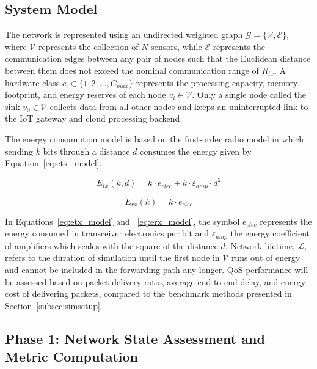 \documentclass[a4paper,fleqn]{cas-dc}
\numberwithin{equation}{section}
\begin{document}
\subsection{System Model}
\label{subsec:sysmodel}

The network is represented using an undirected weighted graph
$\mathcal{G} = \{\mathcal{V}, \mathcal{E}\}$, where $\mathcal{V}$
represents the collection of $N$ sensors, while $\mathcal{E}$
represents the communication edges between any pair of nodes such
that the Euclidean distance between them does not exceed the
nominal communication range of $R_{tx}$.\cite{HaddadPajouh2019SurveyIoTSecurity,Laroui2021EdgeFogIoT}
A hardware class $c_i \in \{1, 2, \ldots, C_{max}\}$ represents
the processing capacity, memory footprint, and energy reserves of
each node $v_i \in \mathcal{V}$. Only a single node called the sink
$v_0 \in \mathcal{V}$ collects data from all other nodes and keeps
an uninterrupted link to the IoT gateway and cloud processing
backend.

The energy consumption model is based on the first-order radio
model in which sending $k$ bits through a distance $d$ consumes the
energy given by Equation~\ref{eq:etx_model}.

\begin{equation}
\label{eq:etx_model}
E_{tx}(k, d) = k \cdot e_{elec} + k \cdot \varepsilon_{amp} \cdot d^{2}
\end{equation}

\begin{equation}
\label{eq:erx_model}
E_{rx}(k) = k \cdot e_{elec}
\end{equation}

In Equations~\ref{eq:etx_model} and ~\ref{eq:erx_model}, 
the symbol $e_{elec}$ represents the energy consumed in transceiver electronics per bit
and $\varepsilon_{amp}$ the energy coefficient of amplifiers which scales with the square of the distance $d$. Network lifetime, $\mathcal{L}$, refers to the duration of simulation until the first node in $\mathcal{V}$ runs out of energy and cannot be included in the forwarding path any longer. QoS performance will be assessed based on packet delivery ratio, average end-to-end delay, and energy cost of delivering packets, compared to the benchmark methods presented in Section~\ref{subsec:simsetup}.

\subsection{Phase 1: Network State Assessment and Metric Computation}
\label{subsec:phase1}
\end{document}
